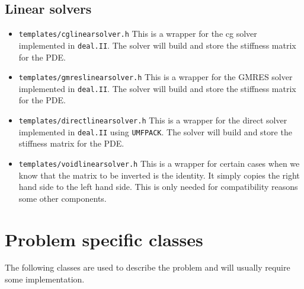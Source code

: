 \subsection{Linear solvers}
\begin{itemize}
\item \texttt{templates/cglinearsolver.h} This is a wrapper for the cg solver implemented in 
  \texttt{deal.II}. The solver will build and store the stiffness matrix for the PDE.
\item \texttt{templates/gmreslinearsolver.h} This is a wrapper for the GMRES solver 
  implemented in \texttt{deal.II}. The solver will build and store the stiffness matrix 
  for the PDE.
\item \texttt{templates/directlinearsolver.h} This is a wrapper for the direct solver 
  implemented in \texttt{deal.II} using \texttt{UMFPACK}. 
  The solver will build and store the stiffness matrix for the PDE.
\item \texttt{templates/voidlinearsolver.h} This is a wrapper for certain cases when we 
  know that the matrix to be inverted is the identity. It simply copies the right hand side to the
  left hand side. This is only needed for compatibility reasons some other components.
\end{itemize}



\section{Problem specific classes}
The following classes are used to describe the problem and will usually require 
some implementation.

